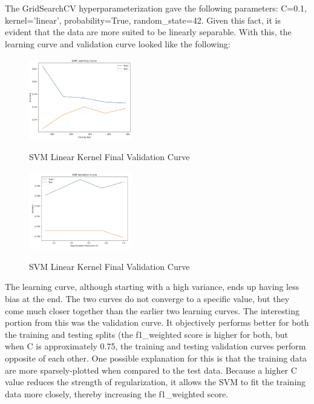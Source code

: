 \documentclass[conference]{IEEEtran}
\begin{document}
The GridSearchCV hyperparameterization gave the following parameters: C=0.1, kernel='linear', probability=True, random\_state=42. Given this fact, it is evident that the data are more suited to be linearly separable. With this, the learning curve and validation curve looked like the following:

\begin{figure}[H]
    \centering
    \includegraphics[width=0.40\textwidth]{Red Wine Quality Graph Images/SVC/svm lin lc fin.png}
    \label{fig:enter-label}
    \caption{SVM Linear Kernel Final Validation Curve}
\end{figure}

\begin{figure}[H]
    \centering
    \includegraphics[width=0.40\textwidth]{Red Wine Quality Graph Images/SVC/svm lin vc fin.png}
    \label{fig:enter-label}
    \caption{SVM Linear Kernel Final Validation Curve}
\end{figure}

The learning curve, although starting with a high variance, ends up having less bias at the end. The two curves do not converge to a specific value, but they come much closer together than the earlier two learning curves. The interesting portion from this was the validation curve. It objectively performs better for both the training and testing splits (the f1\_weighted score is higher for both, but when C is approximately 0.75, the training and testing validation curves perform opposite of each other. One possible explanation for this is that the training data are more sparsely-plotted when compared to the test data. Because a higher C value reduces the strength of regularization, it allows the SVM to fit the training data more closely, thereby increasing the f1\_weighted score. 
\end{document}
